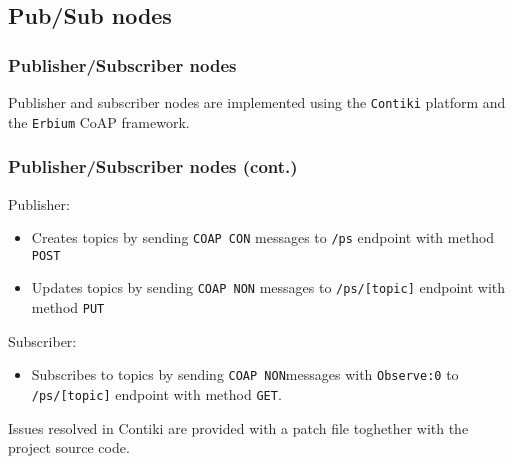\documentclass{beamer}
\begin{document}
\subsection{Pub/Sub nodes}
\frametitle{Publisher/Subscriber nodes}
\begin{frame}
	Publisher and subscriber nodes are implemented using the \texttt{Contiki} platform and the \texttt{Erbium} CoAP framework.
\end{frame}
\frametitle{Publisher/Subscriber nodes (cont.)}
\begin{frame}
	Publisher:
	\begin{itemize}
		\item Creates topics by sending \texttt{COAP CON} messages to \texttt{/ps} endpoint with method \texttt{POST}\pause
		\item Updates topics by sending \texttt{COAP NON} messages to \texttt{/ps/[topic]} endpoint with method \texttt{PUT}\pause
	\end{itemize}
	Subscriber:
	\begin{itemize}
		\item Subscribes to topics by sending \texttt{COAP NON}\footnotemark messages with \texttt{Observe:0} to \texttt{/ps/[topic]} endpoint with method \texttt{GET}.
	\end{itemize}\pause
	Issues resolved in Contiki are provided with a patch file toghether with the project source code.
\end{frame}

\end{document}
